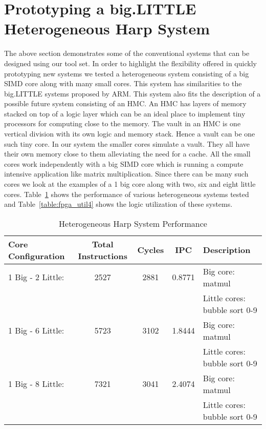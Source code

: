 \section{Prototyping a big.LITTLE Heterogeneous Harp System}
The above section demonstrates some of the conventional systems that can be designed using our tool set. In order to highlight the flexibility offered in quickly prototyping new systems we tested a heterogeneous system consisting of a big SIMD core along with many small cores. This system has similarities to the big.LITTLE systems proposed by ARM\cite{biglittle}. This system also fits the description of a possible future system consisting of an HMC. An HMC has layers of memory stacked on top of a logic layer which can be an ideal place to implement tiny processors for computing close to the memory. The vault in an HMC is one vertical division with its own logic and memory stack. Hence a vault can be one such tiny core. In our system the smaller cores simulate a vault. They all have their own memory close to them alleviating the need for a cache. All the small cores work independently with a big SIMD core which is running a compute intensive application like matrix multiplication. Since there can be many such cores we look at the examples of a 1 big core along with two, six and eight little cores. Table~\ref{table:perf4} shows the performance of various heterogeneous systems tested and Table~\ref{table:fpga_util4} shows the logic utilization of these systems.

\begin{table}[!htbp]
  \centering
  \begin{tabular}{|l|c|c|c|l|}
    \hline
Core Configuration		&Total Instructions 	&Cycles		&IPC		&Description\\
    \hline
1 Big - 2 Little:		&2527 	&2881		&0.8771 	&Big core: matmul\\
								&			&			&			&Little cores: bubble sort 0-9\\
\hline
1 Big - 6 Little:		&5723 	&3102		&1.8444 	&Big core: matmul\\
								&			&			&			&Little cores: bubble sort 0-9\\
\hline
1 Big - 8 Little:		&7321		&3041		&2.4074 	&Big core: matmul\\
								&			&			&			&Little cores: bubble sort 0-9\\
    \hline
  \end{tabular}
  \caption{Heterogeneous Harp System Performance}
  \label{table:perf4}
\end{table}

